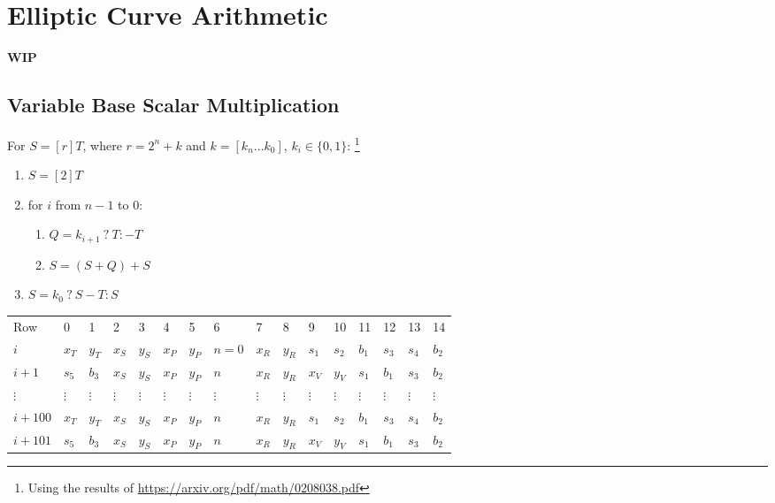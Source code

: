 \section{Elliptic Curve Arithmetic}
\label{section:ec}
\textbf{WIP}

\subsection{Variable Base Scalar Multiplication}
For $S  = [r]T$, where $r = 2^n + k$ and $k = [k_n ... k_0]$, $k_i \in \{0, 1\}$:
\footnote{Using the results of \url{https://arxiv.org/pdf/math/0208038.pdf}}
\begin{enumerate}
	\item $S = [2]T$
	\item for $i$ from $n - 1$ to $0$:
	\begin{enumerate}
		\item $Q = k_{i + 1} \: ? \: T : -T$
		\item $S = (S + Q) + S$
	\end{enumerate}
	\item $S = k_0 \: ? \: S - T : S$
\end{enumerate}

\begin{center}
\begin{table}[H]
\begin{tabular}{llllllllllllllll}
 Row 		& 0 & 1 & 2 & 3 & 4 & 5 & 6 & 7 & 8 & 9 & 10 & 11 & 12 & 13 & 14 \\
 $i$ 			& $x_T$ & $y_T$ & $x_S$ & $y_S$ & $x_P$ & $y_P$ & $n=0$ & $x_R$ & $y_R$ & $s_1$ & $s_2$ & $b_1$ & $s_3$ & $s_4$ & $b_2$ \\
 $i + 1$	& $s_5$ & $b_3$ & $x_S$ & $y_S$ & $x_P$ & $y_P$ & $n$ & $x_R$ & $y_R$ & $x_V$ & $y_V$ & $s_1$ & $b_1$ & $s_3$ & $b_2$ \\
 $\vdots$	& $\vdots$ & $\vdots$ & $\vdots$ & $\vdots$ & $\vdots$ & $\vdots$ & $\vdots$ & $\vdots$ & $\vdots$ & $\vdots$ & $\vdots$ & $\vdots$ & $\vdots$ & $\vdots$ & $\vdots$ \\
 $i + 100$	& $x_T$ & $y_T$ & $x_S$ & $y_S$ & $x_P$ & $y_P$ & $n$ & $x_R$ & $y_R$ & $s_1$ & $s_2$ & $b_1$ & $s_3$ & $s_4$ & $b_2$ \\
 $i + 101$	& $s_5$ & $b_3$ & $x_S$ & $y_S$ & $x_P$ & $y_P$ & $n$ & $x_R$ & $y_R$ & $x_V$ & $y_V$ & $s_1$ & $b_1$ & $s_3$ & $b_2$ \\
\end{tabular}
\end{table}
\end{center}

